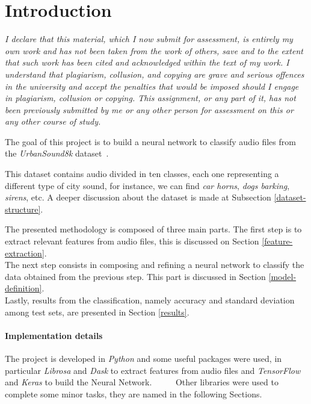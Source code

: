 \section{Introduction}

\emph{I declare that this material, which I now submit for assessment, 
is entirely my own work and has not been taken from the work of others, 
save and to the extent that such work has been cited and acknowledged within 
the text of my work. I understand that plagiarism, collusion, and copying 
are grave and serious offences in the university and accept the penalties that 
would be imposed should I engage in plagiarism, collusion or copying. 
This assignment, or any part of it, has not been previously submitted by 
me or any other person for assessment on this or any other course of study.}

The goal of this project is to build a neural network to classify audio 
files from the \emph{UrbanSound8k} dataset~\cite{dataset}.

This dataset contains audio divided in ten classes, each one representing 
a different type of city sound, for instance, we can find \emph{car horns}, 
\emph{dogs barking}, \emph{sirens}, etc. A deeper discussion about 
the dataset is made at Subsection \vref*{dataset-structure}.

The presented methodology is composed of three main parts.
The first step is to extract relevant features from audio files, 
this is discussed on Section \vref*{feature-extraction}.\\
The next step consists in composing and refining a neural network 
to classify the data obtained from the previous step. This part is
discussed in Section \vref*{model-definition}.\\
Lastly, results from the classification, namely accuracy 
and standard deviation among test sets, are presented in 
Section \vref*{results}.

\paragraph{Implementation details}
The project is developed in \emph{Python} and some useful packages were used, 
in particular \emph{Librosa} and \emph{Dask} to extract features from audio files and 
\emph{TensorFlow} and \emph{Keras} to build the Neural Network.~\cite{python}~\cite{librosa}~\cite{dask}~\cite{tensorflow}~\cite{keras}
Other libraries were used to complete some minor tasks, they are named in 
the following Sections.

